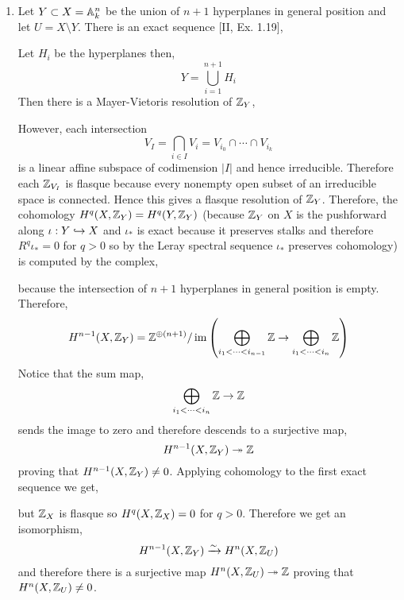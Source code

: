 \documentclass[12pt]{article}
\begin{document}
\begin{enumerate}
\item Let $Y \subset X = \mathbb{A}^n_k$ be the union of $n + 1$ hyperplanes in general position and let $U = X \setminus Y$. 
There is an exact sequence [II, Ex. 1.19],
\begin{center}
\end{center}
Let $H_i$ be the hyperplanes then,
\[ Y = \bigcup_{i = 1}^{n+1} H_i \]
Then there is a Mayer-Vietoris resolution of $\mathbb{Z}_Y$,
\begin{center}
\end{center}
However, each intersection \[ V_I = \bigcap_{i \in I} V_i = V_{i_0} \cap \cdots \cap V_{i_k} \]
is a linear affine subspace of codimension $|I|$ and hence irreducible. Therefore each $\mathbb{Z}_{V_I}$ is flasque because every nonempty open subset of an irreducible space is connected. Hence this gives a flasque resolution of $\mathbb{Z}_Y$. Therefore, the cohomology $H^q(X, \mathbb{Z}_Y) = H^q(Y, \mathbb{Z}_Y)$ (because $\mathbb{Z}_Y$ on $X$ is the pushforward along $\iota : Y \hookrightarrow X$ and $\iota_*$ is exact because it preserves stalks and therefore $R^q \iota_* = 0$ for $q > 0$ so by the Leray spectral sequence $\iota_*$ preserves cohomology) is computed by the complex,
\begin{center}
\end{center}
because the intersection of $n+1$ hyperplanes in general position is empty. Therefore,
\[ H^{n-1}(X, \mathbb{Z}_Y) = \mathbb{Z}^{\oplus (n+1)} / \operatorname{\mathrm{im}}{\left( \bigoplus_{i_1 < \dots < i_{n-1}} \mathbb{Z} \to \bigoplus_{i_1 < \dots < i_n} \mathbb{Z} \right)} \]
Notice that the sum map,
\[ \bigoplus_{i_1 < \dots < i_n} \mathbb{Z} \to \mathbb{Z} \]
sends the image to zero and therefore descends to a surjective map,
\[ H^{n-1}(X, \mathbb{Z}_Y) \twoheadrightarrow \mathbb{Z} \]
proving that $H^{n-1}(X, \mathbb{Z}_Y) \neq 0$. Applying cohomology to the first exact sequence we get,
\begin{center}
\end{center}
but $\mathbb{Z}_X$ is flasque so $H^q(X, \mathbb{Z}_X) = 0$ for $q > 0$. Therefore we get an isomorphism,
\[ H^{n-1}(X, \mathbb{Z}_Y) \xrightarrow{\sim} H^n(X, \mathbb{Z}_U) \]
and therefore there is a surjective map $H^n(X, \mathbb{Z}_U) \twoheadrightarrow \mathbb{Z}$ proving that $H^n(X, \mathbb{Z}_U) \neq 0$.
\end{enumerate}
\end{document}
